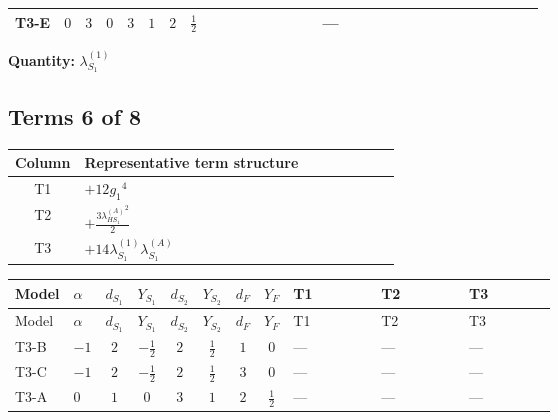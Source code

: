 \documentclass[8pt]{article}
\begin{document}
\begin{landscape}
\begin{longtable}{@{}llcccccc >{\raggedright\arraybackslash}p{0.21\linewidth} >{\raggedright\arraybackslash}p{0.21\linewidth} >{\raggedright\arraybackslash}p{0.21\linewidth}@{}}
\midrule
T3-E & $0$ & $3$ & $0$ & $3$ & $1$ & $2$ & $\frac{1}{2}$ & \scriptsize\adjustbox{max width=\linewidth}{$\begin{gathered} 21 {g_2}^4\end{gathered}$} & --- & \scriptsize\adjustbox{max width=\linewidth}{$\begin{gathered} +{g_2}^2 (-24 {\lambda_{S_1}^{(1)}}-12 {\lambda_{S_1}^{(A)}})\end{gathered}$} \\
\midrule
\bottomrule
\end{longtable}
\clearpage
\noindent\textbf{Quantity: }$\lambda_{S_1}^{(1)}$\par\smallskip
\subsection*{Terms 6 of 8}
\begin{center}
\begin{tabular}{@{}c >{\raggedright\arraybackslash}p{0.82\linewidth}@{}}
\toprule
Column & Representative term structure \\
\midrule
T1 & \(\displaystyle +12 {g_1}^4\) \\
\midrule
T2 & \(\displaystyle +\frac{3 {\lambda_{HS_1}^{(A)}}^2}{2}\) \\
\midrule
T3 & \(\displaystyle +14 {\lambda_{S_1}^{(1)}} {\lambda_{S_1}^{(A)}}\) \\
\midrule
\bottomrule
\end{tabular}
\end{center}
\smallskip
\tiny
\begin{longtable}{@{}llcccccc >{\raggedright\arraybackslash}p{0.21\linewidth} >{\raggedright\arraybackslash}p{0.21\linewidth} >{\raggedright\arraybackslash}p{0.21\linewidth}@{}}
\toprule
Model & $\alpha$ & $d_{S_1}$ & $Y_{S_1}$ & $d_{S_2}$ & $Y_{S_2}$ & $d_F$ & $Y_F$ & T1 & T2 & T3 \\
\midrule
\endfirsthead
\toprule
Model & $\alpha$ & $d_{S_1}$ & $Y_{S_1}$ & $d_{S_2}$ & $Y_{S_2}$ & $d_F$ & $Y_F$ & T1 & T2 & T3 \\
\midrule
\endhead
T3-B & $-1$ & $2$ & $-\frac{1}{2}$ & $2$ & $\frac{1}{2}$ & $1$ & $0$ & --- & --- & --- \\
\midrule
T3-C & $-1$ & $2$ & $-\frac{1}{2}$ & $2$ & $\frac{1}{2}$ & $3$ & $0$ & --- & --- & --- \\
\midrule
T3-A & $0$ & $1$ & $0$ & $3$ & $1$ & $2$ & $\frac{1}{2}$ & --- & --- & --- \\
\midrule

\end{longtable}
\end{landscape}
\end{document}
